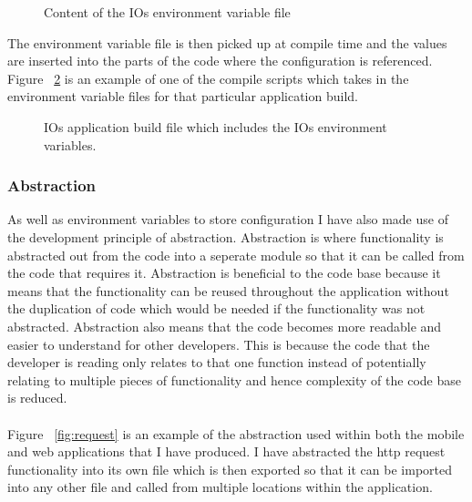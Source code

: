 \documentclass[a4paper,11pt]{report}
\begin{document}
\begin{figure}[H]
    \centering
    \caption{Content of the IOs environment variable file}
    \label{fig:iosVars}
\end{figure}

The environment variable file is then picked up at compile time and the values are inserted into the parts of the code where the configuration is referenced. Figure ~\ref{fig:iosScript} is an example of one of the compile scripts which takes in the environment variable files for that particular application build.
\begin{figure}[H]
    \centering
    \caption{IOs application build file which includes the IOs environment variables.}
    \label{fig:iosScript}
\end{figure}

\subsubsection{Abstraction}
As well as environment variables to store configuration I have also made use of the development principle of abstraction.
Abstraction is where functionality is abstracted out from the code into a seperate module so that it can be called from
the code that requires it. Abstraction is beneficial to the code base because it means that the functionality can be reused
throughout the application without the duplication of code which would be needed if the functionality was not abstracted.
Abstraction also means that the code becomes more readable and easier to understand for other developers. 
This is because the code that the developer is reading only relates to that one function instead of potentially 
relating to multiple pieces of functionality and hence complexity of the code base is reduced. \cite{abstraction}
\\
\\
 Figure ~\ref{fig:request} is an example of the abstraction used within both
the mobile and web applications that I have produced. I have abstracted the http request functionality into its own file 
which is then exported so that it can be imported into any other file and called from multiple locations within the application.
\end{document}
